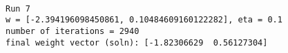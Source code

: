 \documentclass[11pt]{article}
\begin{document}
    \begin{center}
    \end{center}
    { \hspace*{\fill} \\}
    
    \begin{Verbatim}[commandchars=\\\{\}]
Run 7
w = [-2.394196098450861, 0.10484609160122282], eta = 0.1
number of iterations = 2940
final weight vector (soln): [-1.82306629  0.56127304]

    \end{Verbatim}

    \begin{center}
    \end{center}
    { \hspace*{\fill} \\}
    

    
    
    
    
\end{document}
